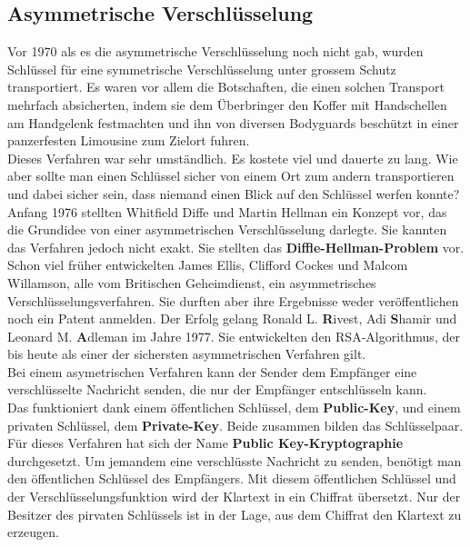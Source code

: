\subsection{Asymmetrische Verschlüsselung}
Vor 1970 als es die asymmetrische Verschlüsselung noch nicht gab, wurden Schlüssel für eine symmetrische Verschlüsselung unter grossem Schutz transportiert.
%
Es waren vor allem die Botschaften, die einen solchen Transport mehrfach absicherten, indem sie dem Überbringer den Koffer mit Handschellen am Handgelenk festmachten und ihn von diversen Bodyguards beschützt in einer panzerfesten Limousine zum Zielort fuhren.\\
Dieses Verfahren war sehr umständlich. Es kostete viel und dauerte zu lang. Wie aber sollte man einen Schlüssel sicher von einem Ort zum andern transportieren und dabei sicher sein, dass niemand einen Blick auf den Schlüssel werfen konnte?\\
%
Anfang 1976 stellten Whitfield Diffe und Martin Hellman ein Konzept vor, das die Grundidee von einer asymmetrischen Verschlüsselung darlegte. Sie kannten das Verfahren jedoch nicht exakt. Sie stellten das \textbf{Diffle-Hellman-Problem} vor. \cite{rsa_and_public_key}\\ %
Schon viel früher entwickelten James Ellis, Clifford Cockes und Malcom Willamson, alle vom Britischen Geheimdienst, ein asymmetrisches Verschlüsselungsverfahren. Sie durften aber ihre Ergebnisse weder veröffentlichen noch ein Patent anmelden. 
Der Erfolg gelang Ronald L. \textbf{R}ivest, Adi \textbf{S}hamir und Leonard M. \textbf{A}dleman im Jahre 1977. Sie entwickelten den RSA-Algorithmus, der bis heute als einer der sichersten asymmetrischen Verfahren gilt.\\[2ex]
%
Bei einem asymetrischen Verfahren kann der Sender dem Empfänger eine verschlüsselte Nachricht senden, die nur der Empfänger entschlüsseln kann.\\
%
Das funktioniert dank einem öffentlichen Schlüssel, dem \textbf{Public-Key}, und einem privaten Schlüssel, dem \textbf{Private-Key}. Beide zusammen bilden das Schlüsselpaar.\\
Für dieses Verfahren hat sich der Name \textbf{Public Key-Kryptographie} durchgesetzt.
%
%
Um jemandem eine verschlüsste Nachricht zu senden, benötigt man den öffentlichen Schlüssel des Empfängers. Mit diesem öffentlichen Schlüssel und der Verschlüsselungsfunktion wird der Klartext in ein Chiffrat übersetzt. Nur der Besitzer des pirvaten Schlüssels ist in der Lage, aus dem Chiffrat den Klartext zu erzeugen.\\
